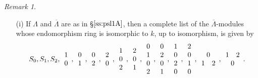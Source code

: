 \documentclass{amsart}
\theoremstyle{plain}
\theoremstyle{definition}
\theoremstyle{remark}
\newtheorem{rem}[thm]{Remark}
\begin{document}
\begin{rem}
\begin{enumerate}
\item[(i)]
If $\Lambda$ and $\overline{\Lambda}$ are as in \S$\ref{ss:psl1A}$, then a complete list of the 
$\overline{\Lambda}$-modules whose endomorphism ring is isomorphic to $k$, up to isomorphism, 
is given by
$$S_0,S_1, S_2,  \begin{array}{c}1\\0\end{array}, \begin{array}{c}0\\1\end{array},
\begin{array}{c}0\\2\end{array},\begin{array}{c}2\\0\end{array},
\begin{array}{c}1\\0\\2\end{array},\begin{array}{c}2\\0\\1\end{array},
\begin{array}{c}0\\1\\0\\2\end{array}, \begin{array}{c}0\\2\\0\\1\end{array},
\begin{array}{c}1\\0\\2\\0\end{array},\begin{array}{c}2\\0\\1\\0\end{array},
\begin{array}{cc}\multicolumn{2}{c}{0}\\1&2\end{array}, 
\begin{array}{cc}1&2\\\multicolumn{2}{c}{0}\end{array}.$$

\end{enumerate}
\end{rem}
\end{document}
